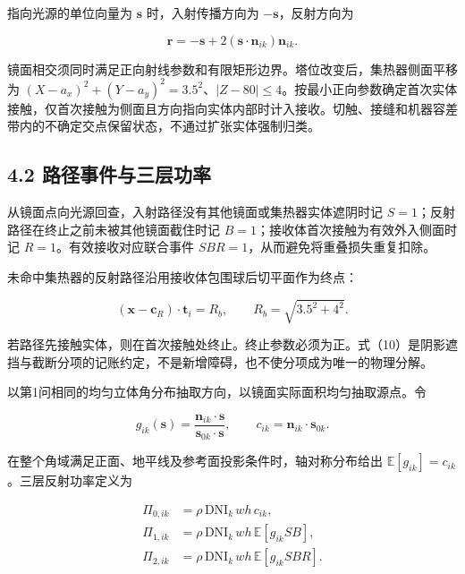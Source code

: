 \documentclass[UTF8,fontset=windows,zihao=-4]{ctexart}
\begin{document}
\par\noindent\begin{minipage}{\linewidth}
指向光源的单位向量为 \(\boldsymbol s\) 时，入射传播方向为 \(-\boldsymbol s\)，反射方向为

\[
\boldsymbol r=-\boldsymbol s+2(\boldsymbol s\cdot\boldsymbol n_{ik})\boldsymbol n_{ik}.
\tag{9}
\]
\end{minipage}\par

镜面相交须同时满足正向射线参数和有限矩形边界。塔位改变后，集热器侧面平移为 \((X-a_x)^2+(Y-a_y)^2=3.5^2\)、\(|Z-80|\le4\)。按最小正向参数确定首次实体接触，仅首次接触为侧面且方向指向实体内部时计入接收。切触、接缝和机器容差带内的不确定交点保留状态，不通过扩张实体强制归类。

\subsection*{4.2 路径事件与三层功率}

从镜面点向光源回查，入射路径没有其他镜面或集热器实体遮阴时记 \(S=1\)；反射路径在终止之前未被其他镜面截住时记 \(B=1\)；接收体首次接触为有效外入侧面时记 \(R=1\)。有效接收对应联合事件 \(SBR=1\)，从而避免将重叠损失重复扣除。

\par\noindent\begin{minipage}{\linewidth}
未命中集热器的反射路径沿用接收体包围球后切平面作为终点：

\[
(\boldsymbol x-\boldsymbol c_R)\cdot\boldsymbol t_i=R_b,
\qquad R_b=\sqrt{3.5^2+4^2}.
\tag{10}
\]
\end{minipage}\par

若路径先接触实体，则在首次接触处终止。终止参数必须为正。式（10）是阴影遮挡与截断分项的记账约定，不是新增障碍，也不使分项成为唯一的物理分解。

\par\noindent\begin{minipage}{\linewidth}
以第1问相同的均匀立体角分布抽取方向，以镜面实际面积均匀抽取源点。令

\[
g_{ik}(\boldsymbol s)=
\frac{\boldsymbol n_{ik}\cdot\boldsymbol s}{\boldsymbol s_{0k}\cdot\boldsymbol s},
\qquad c_{ik}=\boldsymbol n_{ik}\cdot\boldsymbol s_{0k}.
\tag{11}
\]
\end{minipage}\par

\par\noindent\begin{minipage}{\linewidth}
在整个角域满足正面、地平线及参考面投影条件时，轴对称分布给出 \(\mathbb E[g_{ik}]=c_{ik}\)。三层反射功率定义为

\[
\begin{aligned}
\Pi_{0,ik}&=\rho\,\mathrm{DNI}_k\,wh\,c_{ik},\\
\Pi_{1,ik}&=\rho\,\mathrm{DNI}_k\,wh\,\mathbb E[g_{ik}SB],\\
\Pi_{2,ik}&=\rho\,\mathrm{DNI}_k\,wh\,\mathbb E[g_{ik}SBR].
\end{aligned}
\tag{12}
\]
\end{minipage}\par
\end{document}
